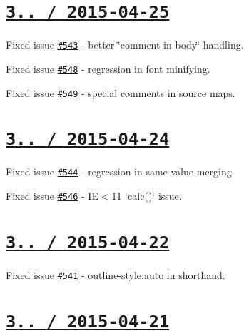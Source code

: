 \section*{\href{https://github.com/jakubpawlowicz/clean-css/compare/v3.2.4...v3.2.5}{\tt 3.. / 2015-\/04-\/25} }


\begin{DoxyItemize}
\item Fixed issue \href{https://github.com/jakubpawlowicz/clean-css/issues/543}{\tt \#543} -\/ better \char`\"{}comment in body\char`\"{} handling.
\item Fixed issue \href{https://github.com/jakubpawlowicz/clean-css/issues/548}{\tt \#548} -\/ regression in font minifying.
\item Fixed issue \href{https://github.com/jakubpawlowicz/clean-css/issues/549}{\tt \#549} -\/ special comments in source maps.
\end{DoxyItemize}

\section*{\href{https://github.com/jakubpawlowicz/clean-css/compare/v3.2.3...v3.2.4}{\tt 3.. / 2015-\/04-\/24} }


\begin{DoxyItemize}
\item Fixed issue \href{https://github.com/jakubpawlowicz/clean-css/issues/544}{\tt \#544} -\/ regression in same value merging.
\item Fixed issue \href{https://github.com/jakubpawlowicz/clean-css/issues/546}{\tt \#546} -\/ IE$<$11 `calc()` issue.
\end{DoxyItemize}

\section*{\href{https://github.com/jakubpawlowicz/clean-css/compare/v3.2.2...v3.2.3}{\tt 3.. / 2015-\/04-\/22} }


\begin{DoxyItemize}
\item Fixed issue \href{https://github.com/jakubpawlowicz/clean-css/issues/541}{\tt \#541} -\/ {\ttfamily outline-\/style\+:auto} in shorthand.
\end{DoxyItemize}

\section*{\href{https://github.com/jakubpawlowicz/clean-css/compare/v3.2.1...v3.2.2}{\tt 3.. / 2015-\/04-\/21} }


